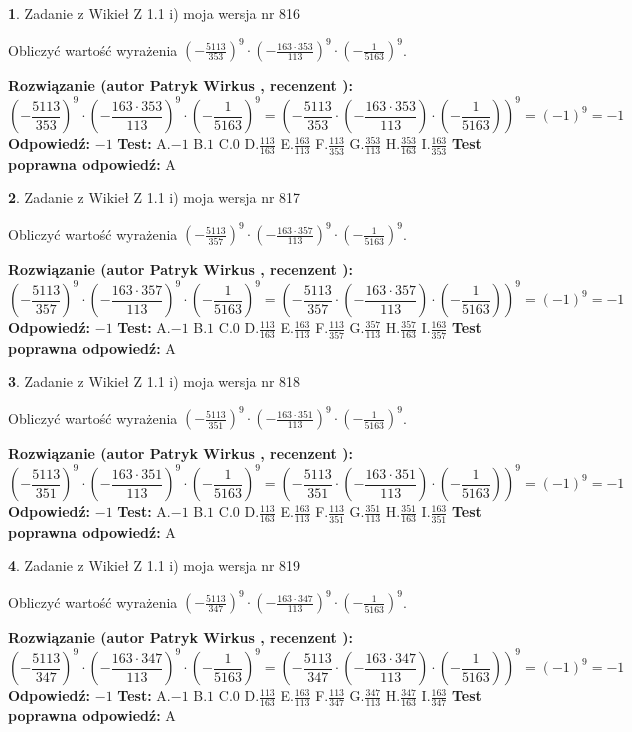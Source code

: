 \documentclass[12pt, a4paper]{article}
\theoremstyle{definition} %
\newtheorem{zad}{}
\newcommand{\zadStart}[1]{\begin{zad}#1\newline}
\newcommand{\zadStop}{\end{zad}}
\newcommand{\rozwStart}[2]{\noindent \textbf{Rozwiązanie (autor #1 , recenzent #2): }\newline}
\newcommand{\rozwStop}{\newline}
\newcommand{\odpStart}{\noindent \textbf{Odpowiedź:}\newline}
\newcommand{\odpStop}{\newline}
\newcommand{\testStart}{\noindent \textbf{Test:}\newline}
\newcommand{\testStop}{\newline}
\newcommand{\kluczStart}{\noindent \textbf{Test poprawna odpowiedź:}\newline}
\newcommand{\kluczStop}{\newline}
\begin{document}
\zadStart{Zadanie z Wikieł Z 1.1 i) moja wersja nr 816}

Obliczyć wartość wyrażenia $(-\frac{5113}{353})^{9} \cdot (-\frac{163 \cdot 353}{113})^{9} \cdot (-\frac{1}{5163})^{9}$.
\zadStop
\rozwStart{Patryk Wirkus}{}
$$(-\frac{5113}{353})^{9} \cdot (-\frac{163 \cdot 353}{113})^{9} \cdot (-\frac{1}{5163})^{9} = (-\frac{5113}{353} \cdot (-\frac{163 \cdot 353}{113}) \cdot (-\frac{1}{5163}))^{9} = (-1)^{9} = -1$$
\rozwStop
\odpStart
$-1$
\odpStop
\testStart
A.$-1$ B.$1$ C.$0$ D.$\frac{113}{163}$ E.$\frac{163}{113}$
F.$\frac{113}{353}$ G.$\frac{353}{113}$
H.$\frac{353}{163}$
I.$\frac{163}{353}$
\testStop
\kluczStart
A
\kluczStop



\zadStart{Zadanie z Wikieł Z 1.1 i) moja wersja nr 817}

Obliczyć wartość wyrażenia $(-\frac{5113}{357})^{9} \cdot (-\frac{163 \cdot 357}{113})^{9} \cdot (-\frac{1}{5163})^{9}$.
\zadStop
\rozwStart{Patryk Wirkus}{}
$$(-\frac{5113}{357})^{9} \cdot (-\frac{163 \cdot 357}{113})^{9} \cdot (-\frac{1}{5163})^{9} = (-\frac{5113}{357} \cdot (-\frac{163 \cdot 357}{113}) \cdot (-\frac{1}{5163}))^{9} = (-1)^{9} = -1$$
\rozwStop
\odpStart
$-1$
\odpStop
\testStart
A.$-1$ B.$1$ C.$0$ D.$\frac{113}{163}$ E.$\frac{163}{113}$
F.$\frac{113}{357}$ G.$\frac{357}{113}$
H.$\frac{357}{163}$
I.$\frac{163}{357}$
\testStop
\kluczStart
A
\kluczStop



\zadStart{Zadanie z Wikieł Z 1.1 i) moja wersja nr 818}

Obliczyć wartość wyrażenia $(-\frac{5113}{351})^{9} \cdot (-\frac{163 \cdot 351}{113})^{9} \cdot (-\frac{1}{5163})^{9}$.
\zadStop
\rozwStart{Patryk Wirkus}{}
$$(-\frac{5113}{351})^{9} \cdot (-\frac{163 \cdot 351}{113})^{9} \cdot (-\frac{1}{5163})^{9} = (-\frac{5113}{351} \cdot (-\frac{163 \cdot 351}{113}) \cdot (-\frac{1}{5163}))^{9} = (-1)^{9} = -1$$
\rozwStop
\odpStart
$-1$
\odpStop
\testStart
A.$-1$ B.$1$ C.$0$ D.$\frac{113}{163}$ E.$\frac{163}{113}$
F.$\frac{113}{351}$ G.$\frac{351}{113}$
H.$\frac{351}{163}$
I.$\frac{163}{351}$
\testStop
\kluczStart
A
\kluczStop



\zadStart{Zadanie z Wikieł Z 1.1 i) moja wersja nr 819}

Obliczyć wartość wyrażenia $(-\frac{5113}{347})^{9} \cdot (-\frac{163 \cdot 347}{113})^{9} \cdot (-\frac{1}{5163})^{9}$.
\zadStop
\rozwStart{Patryk Wirkus}{}
$$(-\frac{5113}{347})^{9} \cdot (-\frac{163 \cdot 347}{113})^{9} \cdot (-\frac{1}{5163})^{9} = (-\frac{5113}{347} \cdot (-\frac{163 \cdot 347}{113}) \cdot (-\frac{1}{5163}))^{9} = (-1)^{9} = -1$$
\rozwStop
\odpStart
$-1$
\odpStop
\testStart
A.$-1$ B.$1$ C.$0$ D.$\frac{113}{163}$ E.$\frac{163}{113}$
F.$\frac{113}{347}$ G.$\frac{347}{113}$
H.$\frac{347}{163}$
I.$\frac{163}{347}$
\testStop
\kluczStart
A
\kluczStop
\end{document}
